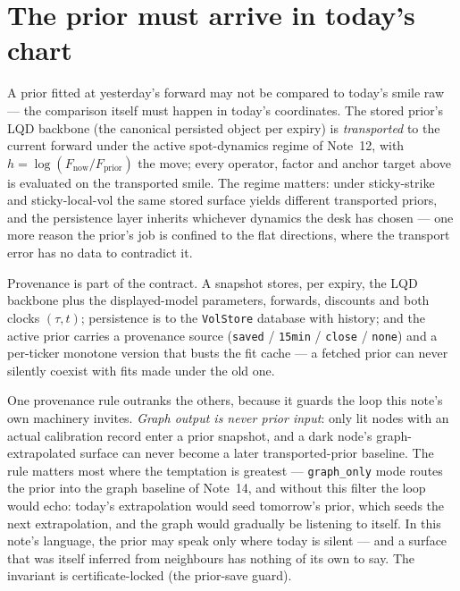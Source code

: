 \documentclass[11pt]{article}
\begin{document}
\section{The prior must arrive in today's chart}
\label{sec:transport}

A prior fitted at yesterday's forward may not be compared to today's
smile raw --- the comparison itself must happen in today's
coordinates.  The stored prior's LQD backbone (the canonical persisted
object per expiry) is \emph{transported} to the current forward under
the active spot-dynamics regime of Note~12, with
$h=\log(F_{\mathrm{now}}/F_{\mathrm{prior}})$ the move; every
operator, factor and anchor target above is evaluated on the
transported smile.  The regime matters: under sticky-strike and
sticky-local-vol the same stored surface yields different transported
priors, and the persistence layer inherits whichever dynamics the
desk has chosen --- one more reason the prior's job is confined to
the flat directions, where the transport error has no data to
contradict it.

Provenance is part of the contract.  A snapshot stores, per expiry,
the LQD backbone plus the displayed-model parameters, forwards,
discounts and both clocks $(\tau,t)$; persistence is to the
\texttt{VolStore} database with history; and the active prior carries
a provenance source (\texttt{saved} / \texttt{15min} / \texttt{close}
/ \texttt{none}) and a per-ticker monotone version that busts the fit
cache --- a fetched prior can never silently coexist with fits made
under the old one.

One provenance rule outranks the others, because it guards the loop
this note's own machinery invites.  \emph{Graph output is never prior
input}: only lit nodes with an actual calibration record enter a prior
snapshot, and a dark node's graph-extrapolated surface can never become
a later transported-prior baseline.  The rule matters most where the
temptation is greatest --- \texttt{graph\_only} mode routes the prior
into the graph baseline of Note~14, and without this filter the loop
would echo: today's extrapolation would seed tomorrow's prior, which
seeds the next extrapolation, and the graph would gradually be
listening to itself.  In this note's language, the prior may speak only
where today is silent --- and a surface that was itself inferred from
neighbours has nothing of its own to say.  The invariant is
certificate-locked (the prior-save guard).
\end{document}
